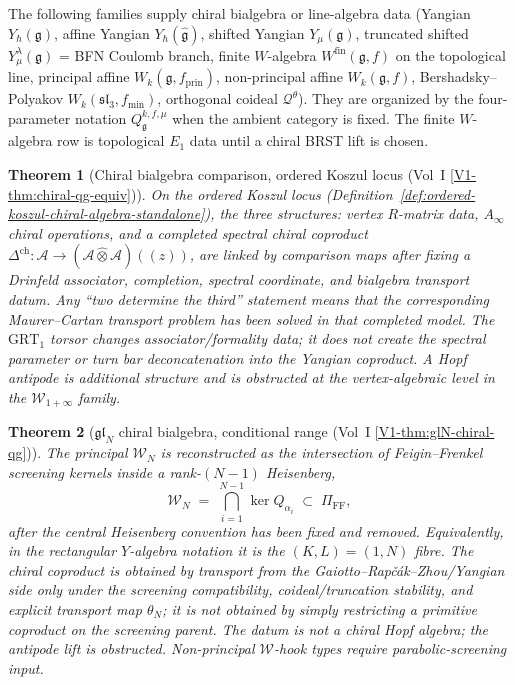 \documentclass[11pt]{article}
\newtheorem{theorem}{Theorem}[section]
\theoremstyle{remark}
\providecommand{\cA}{\mathcal{A}}
\providecommand{\cQ}{\mathcal{Q}}
\providecommand{\cW}{\mathcal{W}}
\providecommand{\fg}{\mathfrak{g}}
\providecommand{\fgl}{\mathfrak{gl}}
\providecommand{\fsl}{\mathfrak{sl}}
\providecommand{\fkm}{\hat{\mathfrak{g}}}
\providecommand{\Ainf}{A_\infty}
\providecommand{\Yhbar}{Y_{\hbar}}
\begin{document}
The following families supply chiral bialgebra or line-algebra data
(Yangian
$\Yhbar(\fg)$, affine Yangian $\Yhbar(\fkm)$, shifted Yangian
$Y_\mu(\fg)$, truncated shifted $Y^\lambda_\mu(\fg)$ = BFN Coulomb
branch, finite $W$-algebra $W^{\mathrm{fin}}(\fg, f)$ on the
topological line, principal affine $W_k(\fg, f_{\mathrm{prin}})$,
non-principal affine
$W_k(\fg, f)$, Bershadsky--Polyakov $W_k(\fsl_3, f_{\mathrm{min}})$,
orthogonal coideal $\cQ^\theta$).  They are organized by the
four-parameter notation $Q_\fg^{k, f, \mu}$ when the ambient category is
fixed.  The finite $W$-algebra row is topological $E_1$ data until a
chiral BRST lift is chosen.

\begin{theorem}[Chiral bialgebra comparison, ordered Koszul locus
(Vol~I
\ref*{V1-thm:chiral-qg-equiv})]%
\label{thm:chiral-bialgebra-equiv-standalone}%
On the ordered Koszul locus
(Definition~\ref{def:ordered-koszul-chiral-algebra-standalone}), the
three structures: vertex $R$-matrix data, $\Ainf$ chiral operations,
and a completed spectral chiral coproduct
$\Delta^{\mathrm{ch}}\colon \cA\to(\cA\widehat{\otimes}\cA)((z))$,
are linked by comparison maps after fixing a Drinfeld associator,
completion, spectral coordinate, and bialgebra transport datum.  Any
``two determine the third'' statement means that the corresponding
Maurer--Cartan transport problem has been solved in that completed
model.  The $\mathrm{GRT}_1$ torsor changes associator/formality data;
it does not create the spectral parameter or turn bar
deconcatenation into the Yangian coproduct.  A Hopf antipode is
additional structure and is obstructed at the vertex-algebraic level
in the $\cW_{1+\infty}$ family.
\end{theorem}

\begin{theorem}[$\fgl_N$ chiral bialgebra, conditional range
(Vol~I
\ref*{V1-thm:glN-chiral-qg})]%
\label{thm:gl-N-chiral-qg-conditional-standalone}%
The principal $\cW_N$ is reconstructed as the intersection of
Feigin--Frenkel screening kernels inside a rank-$(N-1)$ Heisenberg,
\[
  \cW_N \;=\;
  \bigcap_{i=1}^{N-1} \ker Q_{\alpha_i} \;\subset\; \Pi_{\mathrm{FF}},
\]
after the central Heisenberg convention has been fixed and removed.
Equivalently, in the rectangular $Y$-algebra notation it is the
$(K,L)=(1,N)$ fibre.  The chiral coproduct is obtained by transport
from the Gaiotto--Rap\v{c}\'ak--Zhou/Yangian side only under the
screening compatibility, coideal/truncation stability, and explicit
transport map $\theta_N$; it is not obtained by simply restricting a
primitive coproduct on the screening parent.  The datum is not a
chiral Hopf algebra; the antipode lift is obstructed.  Non-principal
$\cW$-hook types require parabolic-screening input.
\end{theorem}
\end{document}
